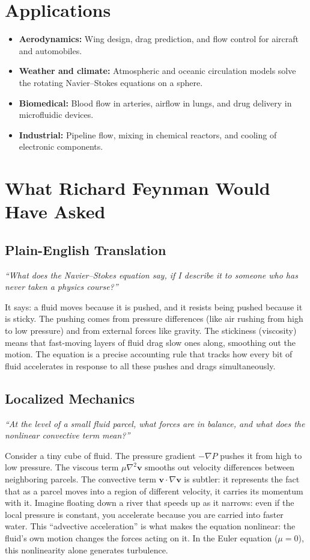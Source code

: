 \documentclass[11pt,openright]{book}
\begin{document}
\section*{Applications}

\begin{itemize}
  \item \textbf{Aerodynamics:} Wing design, drag prediction, and flow control for aircraft and automobiles.
  \item \textbf{Weather and climate:} Atmospheric and oceanic circulation models solve the rotating Navier--Stokes equations on a sphere.
  \item \textbf{Biomedical:} Blood flow in arteries, airflow in lungs, and drug delivery in microfluidic devices.
  \item \textbf{Industrial:} Pipeline flow, mixing in chemical reactors, and cooling of electronic components.
\end{itemize}
\section*{What Richard Feynman Would Have Asked}

\subsection*{Plain-English Translation}
\textit{``What does the Navier--Stokes equation say, if I describe it to someone who has never taken a physics course?''}

It says: a fluid moves because it is pushed, and it resists being pushed because it is sticky. The pushing comes from pressure differences (like air rushing from high to low pressure) and from external forces like gravity. The stickiness (viscosity) means that fast-moving layers of fluid drag slow ones along, smoothing out the motion. The equation is a precise accounting rule that tracks how every bit of fluid accelerates in response to all these pushes and drags simultaneously.

\subsection*{Localized Mechanics}
\textit{``At the level of a small fluid parcel, what forces are in balance, and what does the nonlinear convective term mean?''}

Consider a tiny cube of fluid. The pressure gradient $-\nabla P$ pushes it from high to low pressure. The viscous term $\mu\nabla^{2}\mathbf{v}$ smooths out velocity differences between neighboring parcels. The convective term $\mathbf{v}\cdot\nabla\mathbf{v}$ is subtler: it represents the fact that as a parcel moves into a region of different velocity, it carries its momentum with it. Imagine floating down a river that speeds up as it narrows: even if the local pressure is constant, you accelerate because you are carried into faster water. This ``advective acceleration'' is what makes the equation nonlinear: the fluid's own motion changes the forces acting on it. In the Euler equation ($\mu = 0$), this nonlinearity alone generates turbulence.
\end{document}
